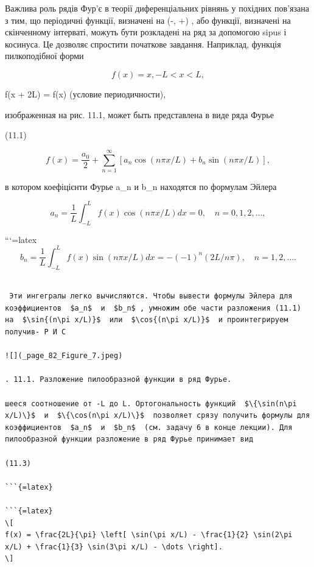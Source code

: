 \documentclass[
  ukrainian,
]{article}
\begin{document}
Важлива роль рядів Фур'є в теорії диференціальних рівнянь у похідних
пов'язана з тим, що періодичні функції, визначені на (-\infty, +\infty)
, або функції, визначені на скінченному інтерваті, можуть бути
розкладені на ряд за допомогою sipus і косинуса. Це дозволяє спростити
початкове завдання. Наприклад, функція пилкоподібної форми

\[
f(x) = x, -L < x < L,
\]

f(x + 2L) = f(x) (условие периодичности),

изображенная на рис. 11.1, может быть представлена в виде ряда Фурье

(11.1)

\[
f(x) = \frac{a_0}{2} + \sum_{n=1}^{\infty} \left[ a_n \cos(n\pi x/L) + b_n \sin(n\pi x/L) \right],
\]

в котором коефіцієнти Фурье a\_n и b\_n находятся по формулам Эйлера

\[
a_n = \frac{1}{L} \int_{-L}^{L} f(x) \cos(n\pi x/L) dx = 0, \quad n = 0, 1, 2, \dots,
\]

```{=latex}
\[
b_n = \frac{1}{L} \int_{-L}^{L} f(x) \sin(n\pi x/L) dx = -(-1)^n (2L/n\pi), \quad n = 1, 2, \dots.
\]

\begin{verbatim}

 Эти ингегралы легко вычисляются. Чтобы вывести формулы Эйлера для коэффициентов  $a_n$  и  $b_n$ , умножим обе части разложения (11.1) на  $\sin{(n\pi x/L)}$  или  $\cos{(n\pi x/L)}$  и проинтегрируем получив- Р И С

![](_page_82_Figure_7.jpeg)

. 11.1. Разложение пилообразной функции в ряд Фурье.

шееся соотношение от -L до L. Ортогональность функций  $\{\sin(n\pi x/L)\}$  и  $\{\cos(n\pi x/L)\}$  позволяет срязу получить формулы для коэффициентов  $a_n$  и  $b_n$  (см. задачу 6 в конце лекции). Для пилообразной функции разложение в ряд Фурье принимает вид

(11.3) 

```{=latex}

```{=latex}
\[
f(x) = \frac{2L}{\pi} \left[ \sin(\pi x/L) - \frac{1}{2} \sin(2\pi x/L) + \frac{1}{3} \sin(3\pi x/L) - \dots \right].
\]
\end{verbatim}
\end{document}
